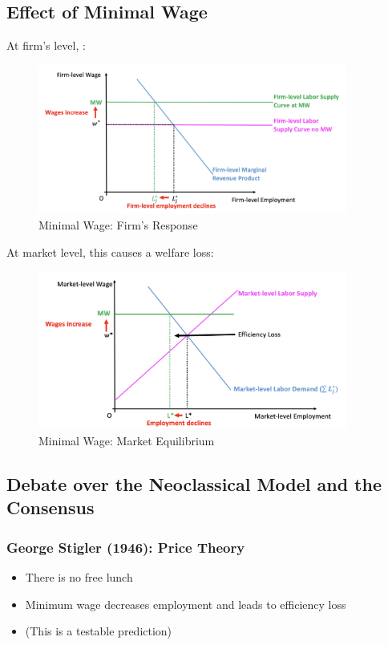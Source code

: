     \subsection{Effect of Minimal Wage}
        At firm's level, :
        \begin{figure}[H]
            \centering
            \includegraphics[width=4in]{images/ch2/neoclassical_3.png}
            \caption{Minimal Wage: Firm's Response}
        \end{figure}
        At market level, this causes a welfare loss:
        \begin{figure}[H]
            \centering
            \includegraphics[width=4in]{images/ch2/neoclassical_4.png}
            \caption{Minimal Wage: Market Equilibrium}
        \end{figure}
    
    \subsection{Debate over the Neoclassical Model and the Consensus}
    
        \subsubsection{George Stigler (1946): Price Theory}
            \begin{itemize}
                \item There is no free lunch
                \item Minimum wage decreases employment and leads to efficiency loss
                \item (This is a testable prediction)
            \end{itemize}
            
